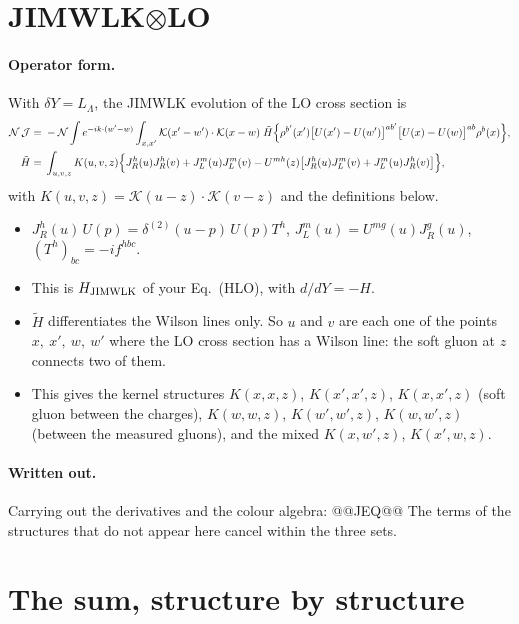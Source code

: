 \documentclass[10pt]{article}
\numberwithin{equation}{section}
\newcommand{\KK}{\mathcal K}
\newcommand{\NN}{\mathcal N}
\newcommand{\LL}{L_\Lambda}
\newcommand{\J}{\mathcal J}
\begin{document}
\section{JIMWLK\texorpdfstring{$\otimes$}{x}LO}\label{sec:J}
\paragraph{Operator form.} With $\delta Y=\LL$, the JIMWLK evolution of the LO cross section is
\begin{align}
\NN\,\J={}&-\NN\int e^{-ik\cdot(w'-w)}\int_{x,x'}\KK(x'-w')\cdot\KK(x-w)\;\tilde H\Big\{\rho^{b'}(x')\big[U(x')-U(w')\big]^{ab'}\big[U(x)-U(w)\big]^{ab}\rho^b(x)\Big\},\notag\\
\tilde H={}&\int_{u,v,z}K(u,v,z)\Big\{J_R^h(u)J_R^h(v)+J_L^m(u)J_L^m(v)-U^{mh}(z)\big[J_R^h(u)J_L^m(v)+J_L^m(u)J_R^h(v)\big]\Big\},
\label{eq:Jop}
\end{align}
with $K(u,v,z)=\KK(u-z)\cdot\KK(v-z)$ and the definitions below.
\begin{itemize}
\item $J_R^h(u)\,U(p)=\delta^{(2)}(u-p)\,U(p)T^h$, $J_L^m(u)=U^{mg}(u)J_R^g(u)$, $(T^h)_{bc}=-if^{hbc}$.
\item This is $H_{\rm JIMWLK}$ of your Eq.~(HLO), with $d/dY=-H$.
\item $\tilde H$ differentiates the Wilson lines only. So $u$ and $v$ are each one of the points $x,\ x',\ w,\ w'$ where the LO cross section has a Wilson line: the soft gluon at $z$ connects two of them.
\item This gives the kernel structures $K(x,x,z)$, $K(x',x',z)$, $K(x,x',z)$ (soft gluon between the charges), $K(w,w,z)$, $K(w',w',z)$, $K(w,w',z)$ (between the measured gluons), and the mixed $K(x,w',z)$, $K(x',w,z)$.
\end{itemize}
\paragraph{Written out.} Carrying out the derivatives and the colour algebra:
@@JEQ@@
The terms of the structures that do not appear here cancel within the three sets.

\section{The sum, structure by structure}\label{sec:Jsum}
\end{document}
